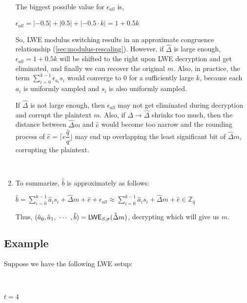 \begin{myproof}
\begin{enumerate}
$ $

The biggest possible value for $\epsilon_{\textit{all}}$ is, 

$\epsilon_{\textit{all}} = |-0.5| + |0.5| + |-0.5 \cdot k| = 1 + 0.5k$ 

So, LWE modulus switching results in an approximate congruence relationship (\autoref{sec:modulus-rescaling}). However, if $\hat \Delta$ is large enough, $\epsilon_{\textit{all}} = 1 + 0.5k$ will be shifted to the right upon LWE decryption and get eliminated, and finally we can recover the original $m$. Also, in practice, the term $\sum\limits_{i=0}^{k-1}\epsilon_{a_i}s_i$ would converge to 0 for a sufficiently large $k$, because each $a_i$ is uniformly sampled and $s_i$ is also uniformly sampled. 

 If $\hat \Delta$ is not large enough, then $\epsilon_{all}$ may not get eliminated during decryption and corrupt the plaintext $m$. Also, if $\Delta \rightarrow \hat\Delta$ shrinks too much, then the distance between $\hat\Delta m$ and $\hat e$ would become too narrow and the rounding process of $\hat e = \Big\lceil e \dfrac{\hat{q}}{q} \Big\rfloor$ may end up overlapping the least significant bit of $\hat \Delta m$, corrupting the plaintext. 

$ $

\item To summarize, $\hat{b}$ is approximately as follows:

$\hat{b} = \sum\limits_{i=0}^{k-1}\hat{a}_is_i + \hat{\Delta} m + \hat{e} + \epsilon_{\textit{all}}  \approx \sum\limits_{i=0}^{k-1}\hat{a}_i  s_i + \hat{\Delta} m + \hat{e} \in \mathbb{Z}_{\hat{q}}$

Thus, $(\hat{a}_0, \hat{a}_1, \text{ } \text{$\cdots$} \text{ }, \hat{b}) = \textsf{LWE}_{{S},\sigma}(\hat{\Delta}  m)$, decrypting which will give us $m$.


\end{enumerate}
\end{myproof}

\subsection{Example}

Suppose we have the following LWE setup:

$ $

$t = 4$

